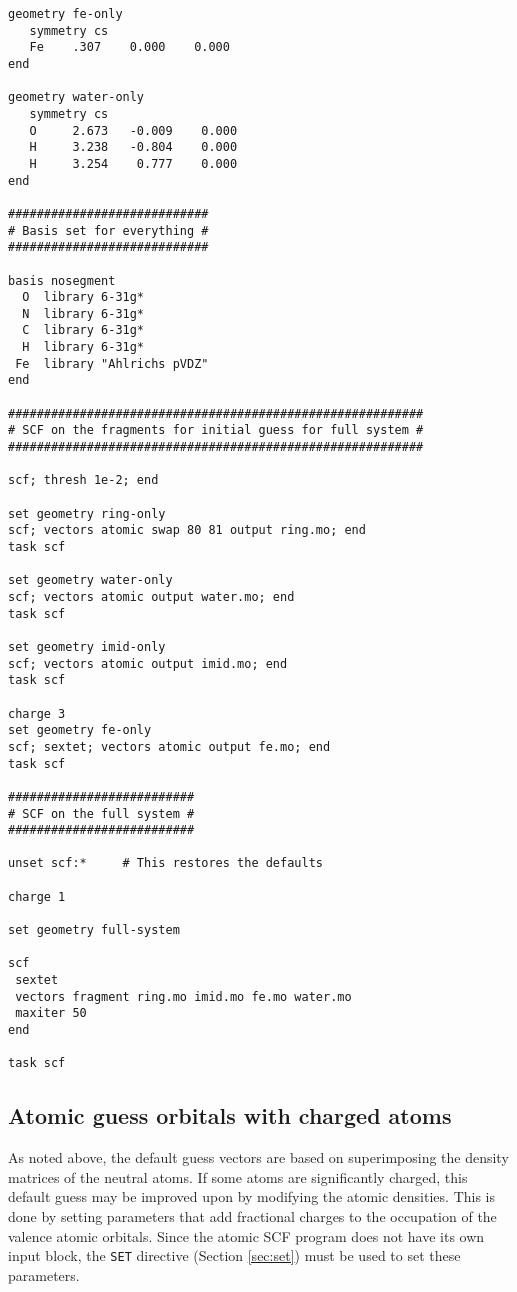 \begin{verbatim}
geometry fe-only
   symmetry cs
   Fe    .307    0.000    0.000
end

geometry water-only
   symmetry cs
   O     2.673   -0.009    0.000
   H     3.238   -0.804    0.000
   H     3.254    0.777    0.000
end

############################
# Basis set for everything #
############################

basis nosegment
  O  library 6-31g*
  N  library 6-31g*
  C  library 6-31g*
  H  library 6-31g*
 Fe  library "Ahlrichs pVDZ"
end

##########################################################
# SCF on the fragments for initial guess for full system #
##########################################################

scf; thresh 1e-2; end

set geometry ring-only
scf; vectors atomic swap 80 81 output ring.mo; end
task scf

set geometry water-only
scf; vectors atomic output water.mo; end
task scf

set geometry imid-only
scf; vectors atomic output imid.mo; end
task scf

charge 3
set geometry fe-only
scf; sextet; vectors atomic output fe.mo; end
task scf

##########################
# SCF on the full system #
##########################

unset scf:*     # This restores the defaults

charge 1

set geometry full-system

scf
 sextet
 vectors fragment ring.mo imid.mo fe.mo water.mo
 maxiter 50
end

task scf
\end{verbatim}

\subsection{Atomic guess orbitals with charged atoms}
\label{sec:atomscf}

As noted above, the default guess vectors are based on superimposing
the density matrices of the neutral atoms.  If some atoms are
significantly charged, this default guess may be improved upon by
modifying the atomic densities.  This is done by setting parameters
that add fractional charges to the occupation of the valence atomic
orbitals.  Since the atomic SCF program does not have its own input
block, the \verb+SET+ directive (Section \ref{sec:set}) must be used
to set these parameters.

